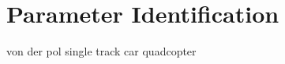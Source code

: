 \section{Parameter Identification} 
\label{sec:experiments:parameter_identification}

von der pol
single track car
quadcopter
